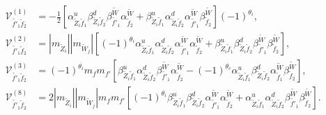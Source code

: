 \documentclass[final,3p,times,pdflatex]{elsarticle}
\begin{document}
\begin{align}
\mathcal{V}_{\tilde{f'}_1 \tilde{f}_2}^{(1)} &= -\frac{1}{2}\left[\alpha_{\tilde{Z}_i \tilde{f}_1}^{u} \beta_{\tilde{Z}_i \tilde{f}_2}^{d} \beta_{\tilde{f'}_1}^{\tilde{W}}\alpha_{\tilde{f}_2}^{\tilde{W}} + \beta_{\tilde{Z}_i \tilde{f}_1}^{u} \alpha_{\tilde{Z}_i \tilde{f}_2}^{d} \alpha_{\tilde{f'}_1}^{\tilde{W}} \beta_{\tilde{f}_2}^{\tilde{W}}\right](-1)^{\theta_i}, \\
\mathcal{V}_{\tilde{f'}_1 \tilde{f}_2}^{(2)} &= |m_{\tilde{Z}_i}||m_{\tilde{W}_j}|\left[(-1)^{\theta_i} \alpha_{\tilde{Z}_i \tilde{f}_1}^{u} \alpha_{\tilde{Z}_i \tilde{f}_2}^{d} \alpha_{\tilde{f'}_1}^{\tilde{W}} \alpha_{\tilde{f}_2}^{\tilde{W}} + \beta_{\tilde{Z}_i \tilde{f}_1}^{u} \beta_{\tilde{Z}_{i} \tilde{f}_2}^{d} \beta_{\tilde{f'}_1}^{\tilde{W}} \beta_{\tilde{f}_2}^{\tilde{W}}\right], \\
\mathcal{V}_{\tilde{f'}_1 \tilde{f}_2}^{(3)} &= (-1)^{\theta_i} m_{f}m_{f'}\left[\beta_{\tilde{Z}_i \tilde{f}_1}^{u} \alpha_{\tilde{Z}_i \tilde{f}_2}^{d} \beta_{\tilde{f'}_1}^{\tilde{W}} \alpha_{\tilde{f}_2}^{\tilde{W}} - (-1)^{\theta_c} \alpha_{\tilde{Z}_i \tilde{f}_1}^{u} \beta_{\tilde{Z}_i \tilde{f}_2}^{d} \alpha_{\tilde{f}_1}^{\tilde{W}} \beta_{\tilde{f}_2}^{\tilde{W}}\right], \\
\mathcal{V}_{\tilde{f'}_1 \tilde{f}_2}^{(8)} &= 2 |m_{\tilde{Z}_i}||m_{\tilde{W}_j}|m_{f} m_{f'} \left[(-1)^{\theta_i}\beta_{\tilde{Z}_i \tilde{f}_1}^{u}\beta_{\tilde{Z}_i \tilde{f}_2}^{d} \alpha_{\tilde{f'}_1}^{\tilde{W}} \alpha_{\tilde{f}_2}^{\tilde{W}} + \alpha_{\tilde{Z}_i \tilde{f}_1}^{u} \alpha_{\tilde{Z}_i \tilde{f}_2}^{d} \beta_{\tilde{f'}_1}^{\tilde{W}} \beta_{\tilde{f}_2}^{\tilde{W}}\right].
\end{align}
\end{document}
